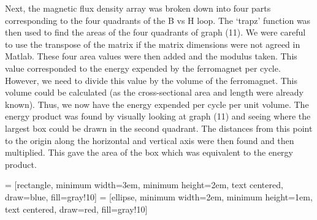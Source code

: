 \documentclass[a4paper]{article}\usepackage[english]{babel}
\begin{document}
Next, the magnetic flux density array was broken down into four parts corresponding to the four quadrants of the B vs H loop. The ‘trapz’ function was then used to find the areas of the four quadrants of graph (11). We were careful to use the transpose of the matrix if the matrix dimensions were not agreed in Matlab. These four area values were then added and the modulus taken. This value corresponded to the energy expended by the ferromagnet per cycle. However, we need to divide this value by the volume of the ferromagnet. This volume could be calculated (as the cross-sectional area and length were already known). Thus, we now have the energy expended per cycle per unit volume.
The energy product was found by visually looking at graph (11) and seeing where the largest box could be drawn in the second quadrant. The distances from this point to the origin along the horizontal and vertical axis were then found and then multiplied. This gave the area of the box which was equivalent to the energy product.


\usetikzlibrary{shapes.geometric, arrows}
 = [rectangle, minimum width=3em, minimum height=2em, text centered, draw=blue, fill=gray!10]
 = [ellipse, minimum width=2em, minimum height=1em, text centered, draw=red, fill=gray!10]
\end{document}
